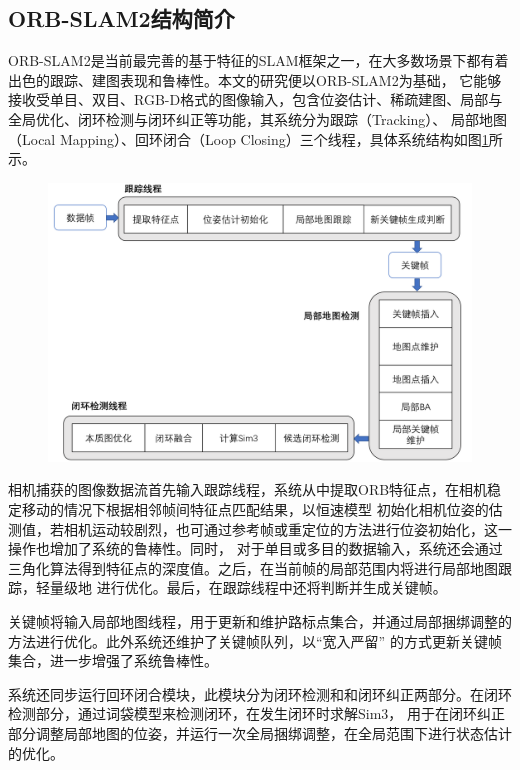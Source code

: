 \subsection{ORB-SLAM2结构简介}
ORB-SLAM2是当前最完善的基于特征的SLAM框架之一，在大多数场景下都有着出色的跟踪、建图表现和鲁棒性。本文的研究便以ORB-SLAM2为基础，
它能够接收受单目、双目、RGB-D格式的图像输入，包含位姿估计、稀疏建图、局部与全局优化、闭环检测与闭环纠正等功能，其系统分为跟踪（Tracking）、
局部地图（Local Mapping）、回环闭合（Loop Closing）三个线程，具体系统结构如图\ref{fig:orbslam}所示。
\begin{figure}[!htbp]
    \centering
    \includegraphics[width=\textwidth]{Img/2-ORBSLAM.png}
    \label{fig:orbslam}
\end{figure}
相机捕获的图像数据流首先输入跟踪线程，系统从中提取ORB特征点，在相机稳定移动的情况下根据相邻帧间特征点匹配结果，以恒速模型
初始化相机位姿的估测值，若相机运动较剧烈，也可通过参考帧或重定位的方法进行位姿初始化，这一操作也增加了系统的鲁棒性。同时，
对于单目或多目的数据输入，系统还会通过三角化算法得到特征点的深度值。之后，在当前帧的局部范围内将进行局部地图跟踪，轻量级地
进行优化。最后，在跟踪线程中还将判断并生成关键帧。

关键帧将输入局部地图线程，用于更新和维护路标点集合，并通过局部捆绑调整的方法进行优化。此外系统还维护了关键帧队列，以“宽入严留”
的方式更新关键帧集合，进一步增强了系统鲁棒性。

系统还同步运行回环闭合模块，此模块分为闭环检测和和闭环纠正两部分。在闭环检测部分，通过词袋模型来检测闭环，在发生闭环时求解Sim3，
用于在闭环纠正部分调整局部地图的位姿，并运行一次全局捆绑调整，在全局范围下进行状态估计的优化。

